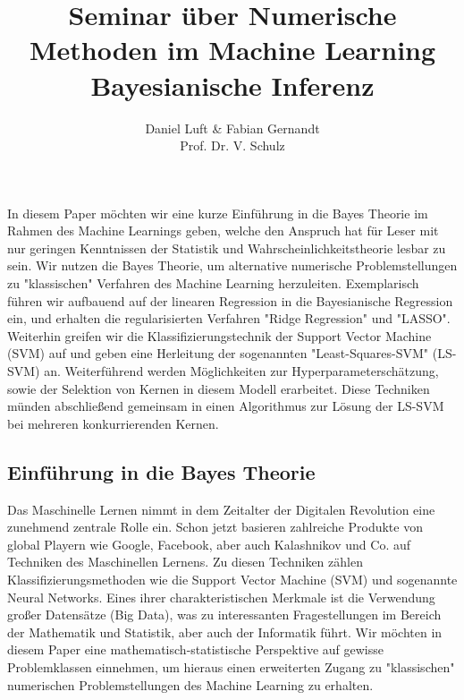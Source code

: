 \documentclass{report}
\theoremstyle{linebreak}
\renewenvironment{abstract}
 {\small
  \begin{center}
  \bfseries \abstractname\vspace{-.5em}\vspace{0pt}
  \end{center}
  \list{}{%
    \setlength{\leftmargin}{12mm}%
    \setlength{\rightmargin}{\leftmargin}%
  }%
  \item\relax}
 {\endlist}
\begin{document}
\title{Seminar über Numerische Methoden im Machine Learning \\ Bayesianische Inferenz}

\author{Daniel Luft & Fabian Gernandt \\ Prof. Dr. V. Schulz}

{}
\begin{abstract}
In diesem Paper möchten wir eine kurze Einführung in die Bayes Theorie im Rahmen des Machine Learnings geben, welche den Anspruch hat für Leser mit nur geringen Kenntnissen der Statistik und Wahrscheinlichkeitstheorie lesbar zu sein. Wir nutzen die Bayes Theorie, um alternative numerische Problemstellungen zu "klassischen" Verfahren des Machine Learning herzuleiten. Exemplarisch führen wir aufbauend auf der linearen Regression in die Bayesianische Regression ein, und erhalten die regularisierten Verfahren "Ridge Regression" und "LASSO". Weiterhin greifen wir die Klassifizierungstechnik der Support Vector Machine (SVM) auf und geben eine Herleitung der sogenannten "Least-Squares-SVM" (LS-SVM) an. Weiterführend werden Möglichkeiten zur Hyperparameterschätzung, sowie der Selektion von Kernen in diesem Modell erarbeitet. Diese Techniken münden abschließend gemeinsam in einen Algorithmus zur Lösung der LS-SVM bei mehreren konkurrierenden Kernen.
\end{abstract}
\vspace{1cm}


\subsection{Einführung in die Bayes Theorie}

Das Maschinelle Lernen nimmt in dem Zeitalter der Digitalen Revolution eine zunehmend zentrale Rolle ein. Schon jetzt basieren zahlreiche Produkte von global Playern wie Google, Facebook, aber auch Kalashnikov und Co. auf Techniken des Maschinellen Lernens. Zu diesen Techniken zählen Klassifizierungsmethoden wie die Support Vector Machine (SVM) und sogenannte Neural Networks. Eines ihrer charakteristischen Merkmale ist die Verwendung großer Datensätze (Big Data), was zu interessanten Fragestellungen im Bereich der Mathematik und Statistik, aber auch der Informatik führt. Wir möchten in diesem Paper eine mathematisch-statistische Perspektive auf gewisse Problemklassen einnehmen, um hieraus einen erweiterten Zugang zu "klassischen" numerischen Problemstellungen des Machine Learning zu erhalten.
\end{document}
